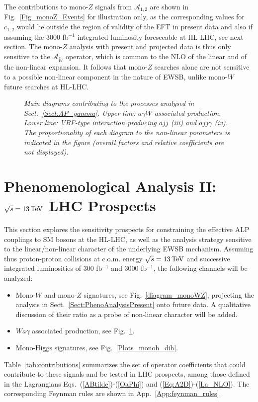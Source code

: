 \documentclass[11pt]{article}
\newcommand{\A}{\mathcal{A}}
\newcommand{\Wt}{{\tilde{W}}}
\renewcommand{\[}{\begin{equation}}
\renewcommand{\]}{\end{equation}}
\newcounter{diagram}
\begin{document}
The contributions to mono-$Z$ signals from $\A_{1,2}$ are shown in Fig.~\ref{Fig_monoZ_Events} for illustration only, as the 
corresponding values for $c_{1,2}$ would lie outside the region of validity of the EFT in present data and also if assuming the $3000$ fb$^{-1}$ 
integrated luminosity foreseeable at HL-LHC, see next section. The mono-$Z$ analysis with present and projected data is thus only sensitive to 
the $\mathcal{A}_{\Wt}$ operator, which is common to the NLO of the linear and of the non-linear expansion. It follows that mono-$Z$ searches alone are not 
sensitive to a possible non-linear component in the nature of EWSB, unlike mono-$W$ future searches at HL-LHC. 



\begin{figure}[h!]

 \caption{\it \small  
Main diagrams contributing to the processes analysed in Sect.~\ref{Sect:AP_gamma}. Upper line: $a\gamma W$  associated production. 
Lower line: VBF-type interaction producing $ajj$ (iii) and $ajj\gamma$ (iv). The proportionality of each diagram to the non-linear parameters is indicated in the 
figure (overall factors and relative coefficients are not displayed).} \label{diagram_AP_VBF}
\end{figure}





\section{Phenomenological Analysis II: $\sqrt{s}=\unit[13]{TeV}$ LHC Prospects}
\label{Sect:PhenoAnalysisFuture}
%
This section explores the sensitivity prospects for constraining the effective ALP couplings to SM bosons at the HL-LHC, as well as the analysis strategy sensitive to the 
linear/non-linear character of the underlying EWSB mechanism. Assuming thus proton-proton collisions at c.o.m. energy $\sqrt{s}=\unit[13]{TeV}$ and successive 
integrated luminosities of  $300$ fb$^{-1}$ and $3000$ fb$^{-1}$, the following channels will be analyzed:
%
\begin{itemize}
\item Mono-$W$ and mono-$Z$ signatures, see Fig.~\ref{diagram_monoWZ}, projecting the analysis in Sect.~\ref{Sect:PhenoAnalysisPresent} onto  future data. 
A qualitative discussion of  their ratio
 as a probe of non-linear character will be added. 
\item $Wa\gamma$ associated production, see Fig.~\ref{diagram_AP_VBF}.
\item Mono-Higgs signatures, see Fig.~\ref{Plots_monoh_dih}.
\end{itemize}
Table~\ref{tab:contributions} summarizes the set of  operator coefficients  that could contribute to these signals  and  be tested in LHC prospects, among those 
defined in the Lagrangians Eqs.~(\ref{ABtilde})-(\ref{OaPhi}) and (\ref{Eq:A2D})-(\ref{La_NLO}).  The corresponding Feynman rules are shown in  
App.~\ref{App:feynman_rules}.
\end{document}
